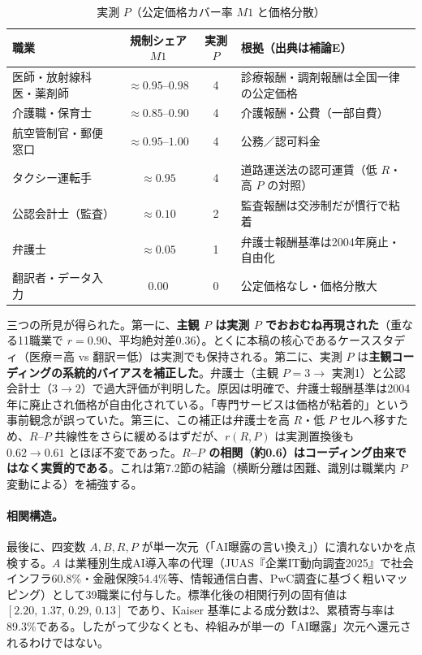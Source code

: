 \documentclass[11pt]{article}
\theoremstyle{plain}
\theoremstyle{definition}
\theoremstyle{remark}
\begin{document}
\begin{table}[h]\centering\small
\caption{実測 $P$（公定価格カバー率 $M1$ と価格分散）}\label{tab:measP}
\begin{tabularx}{\textwidth}{@{}lccX@{}}
\toprule
職業 & 規制シェア $M1$ & 実測 $P$ & 根拠（出典は補論E） \\ \midrule
医師・放射線科医・薬剤師 & $\approx0.95$--$0.98$ & 4 & 診療報酬・調剤報酬は全国一律の公定価格 \\
介護職・保育士 & $\approx0.85$--$0.90$ & 4 & 介護報酬・公費（一部自費） \\
航空管制官・郵便窓口 & $\approx0.95$--$1.00$ & 4 & 公務／認可料金 \\
タクシー運転手 & $\approx0.95$ & 4 & 道路運送法の認可運賃（低 $R$・高 $P$ の対照） \\
公認会計士（監査） & $\approx0.10$ & 2 & 監査報酬は交渉制だが慣行で粘着 \\
弁護士 & $\approx0.05$ & 1 & 弁護士報酬基準は2004年廃止・自由化 \\
翻訳者・データ入力 & $0.00$ & 0 & 公定価格なし・価格分散大 \\
\bottomrule
\end{tabularx}
\end{table}

三つの所見が得られた。第一に、\textbf{主観 $P$ は実測 $P$ でおおむね再現された}（重なる11職業で $r=0.90$、平均絶対差0.36）。とくに本稿の核心であるケーススタディ（医療＝高 vs 翻訳＝低）は実測でも保持される。第二に、実測 $P$ は\textbf{主観コーディングの系統的バイアスを補正した}。弁護士（主観 $P=3\to$ 実測1）と公認会計士（$3\to2$）で過大評価が判明した。原因は明確で、弁護士報酬基準は2004年に廃止され価格が自由化されている。「専門サービスは価格が粘着的」という事前観念が誤っていた。第三に、この補正は弁護士を高 $R$・低 $P$ セルへ移すため、$R$--$P$ 共線性をさらに緩めるはずだが、$r(R,P)$ は実測置換後も $0.62\to0.61$ とほぼ不変であった。\textbf{$R$--$P$ の相関（約0.6）はコーディング由来ではなく実質的である}。これは第7.2節の結論（横断分離は困難、識別は職業内 $P$ 変動による）を補強する。

\paragraph{相関構造。}最後に、四変数 $A,B,R,P$ が単一次元（「AI曝露の言い換え」）に潰れないかを点検する。$A$ は業種別生成AI導入率の代理（JUAS『企業IT動向調査2025』で社会インフラ60.8\%・金融保険54.4\%等、情報通信白書、PwC調査に基づく粗いマッピング）として39職業に付与した。標準化後の相関行列の固有値は $[2.20,\,1.37,\,0.29,\,0.13]$ であり、Kaiser 基準による成分数は2、累積寄与率は89.3\%である。したがって少なくとも、枠組みが単一の「AI曝露」次元へ還元されるわけではない。
\end{document}

